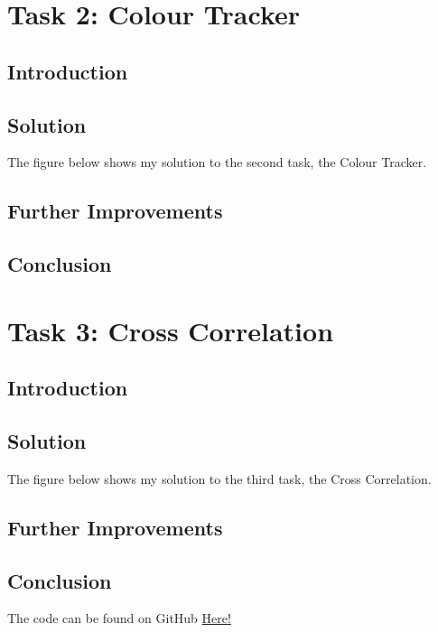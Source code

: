 \documentclass[conference]{IEEEtran}
\newcommand{\forceindent}{\leavevmode{\parindent=1em\indent}}
\begin{document}
\section{Task 2: Colour Tracker}

\subsection{Introduction}

\subsection{Solution}
\forceindent The figure below shows my solution to the second task, the Colour Tracker. 

\subsection{Further Improvements}

\subsection{Conclusion}

\section{Task 3: Cross Correlation}

\subsection{Introduction}

\subsection{Solution}
\forceindent The figure below shows my solution to the third task, the Cross Correlation. 

\subsection{Further Improvements}

\subsection{Conclusion}




The code can be found on GitHub \href{https://github.com/LukeDWaller99/Aint308}{Here!}
\end{document}
